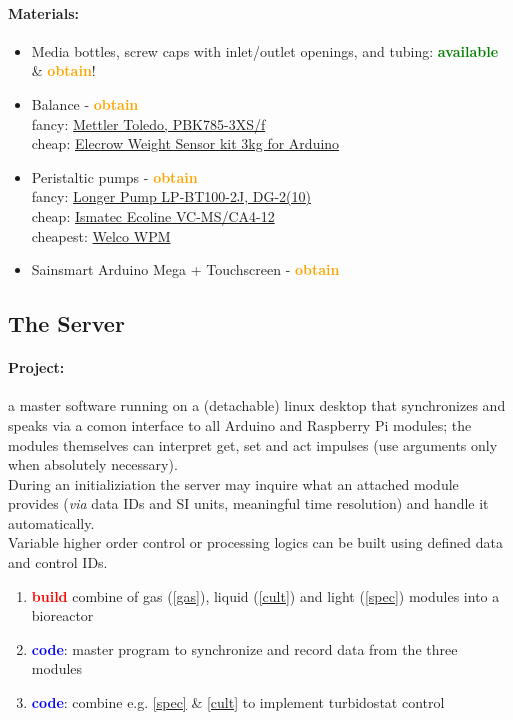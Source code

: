 \documentclass[12pt,a4paper]{scrartcl}
\newcommand{\obtain}[0]{\textcolor{orange}{\textbf{obtain}}}
\newcommand{\avail}[0]{\textcolor{green}{\textbf{available}}}
\newcommand{\build}[0]{\textcolor{red}{\textbf{build}}}
\newcommand{\code}[0]{\textcolor{blue}{\textbf{code}}}
\begin{document}
\paragraph{Materials:}
\begin{itemize}
\item Media bottles, screw caps with inlet/outlet openings,
  and tubing: \avail{} \& \obtain{}!
\item Balance - \obtain{}\\
  fancy:
  \href{http://de.mt.com/de/de/home/products/Industrial_Weighing_Solutions/bench-scales/weighing-platforms/high-resolution/PBK785.html}{Mettler Toledo, PBK785-3XS/f}\\cheap:
  \href{http://www.elecrow.com/weight-sensor-kit-3kg-p-883.html}{Elecrow
    Weight Sensor kit 3kg for Arduino}
\item Peristaltic pumps - \obtain{}\\ fancy:
  \href{http://www.drifton.dk/de/product/lp-bt100-2j-13/}{Longer Pump
    LP-BT100-2J, DG-2(10)}\\cheap:
  \href{http://www.ismatec.com/int_e/pumps/t_ecoline/ecomsca4.htm}{Ismatec
    Ecoline VC-MS/CA4-12}\\ cheapest: \href{Welco WPM}{Welco WPM}
\item Sainsmart Arduino Mega + Touchscreen - \obtain{}
\end{itemize}

\newpage
\subsection{The Server}
\paragraph{Project:} a master software running on a (detachable) linux 
desktop that synchronizes and speaks via a comon interface to all
Arduino and Raspberry Pi modules; the modules themselves can interpret
get, set and act impulses (use arguments only when absolutely
necessary).\\
During an initializiation the server may inquire what an
attached module provides (\textit{via} data IDs and SI units, meaningful
time resolution) and handle it automatically. \\
Variable higher order control or processing logics can be built
using defined data and control IDs.
\begin{enumerate}
\item \build{} combine of gas (\ref{gas}), liquid (\ref{cult})
  and light (\ref{spec}) modules into a bioreactor
\item \code{}: master program to synchronize and record data from
  the three modules
\item \code{}: combine e.g. \ref{spec} \& \ref{cult} to implement
  turbidostat control
\end{enumerate}
\end{document}
